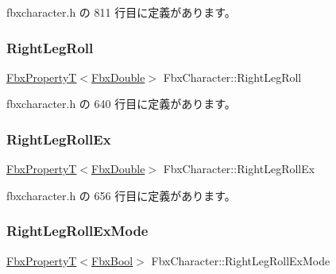  fbxcharacter.\+h の 811 行目に定義があります。

\mbox{\label{class_fbx_character_a2f5abce5bc5a72830f029b959077d7b2}} 
\subsubsection{\texorpdfstring{Right\+Leg\+Roll}{RightLegRoll}}
{\footnotesize\ttfamily \hyperlink{class_fbx_property_t}{Fbx\+PropertyT}$<$\hyperlink{fbxtypes_8h_a171e72a1c46fc15c1a6c9c31948c1c5b}{Fbx\+Double}$>$ Fbx\+Character\+::\+Right\+Leg\+Roll}



 fbxcharacter.\+h の 640 行目に定義があります。

\mbox{\label{class_fbx_character_a3db8a0efa15b90ce8afe21b454615153}} 
\subsubsection{\texorpdfstring{Right\+Leg\+Roll\+Ex}{RightLegRollEx}}
{\footnotesize\ttfamily \hyperlink{class_fbx_property_t}{Fbx\+PropertyT}$<$\hyperlink{fbxtypes_8h_a171e72a1c46fc15c1a6c9c31948c1c5b}{Fbx\+Double}$>$ Fbx\+Character\+::\+Right\+Leg\+Roll\+Ex}



 fbxcharacter.\+h の 656 行目に定義があります。

\mbox{\label{class_fbx_character_a98fcff118d93fcd5db044179fc3d9487}} 
\subsubsection{\texorpdfstring{Right\+Leg\+Roll\+Ex\+Mode}{RightLegRollExMode}}
{\footnotesize\ttfamily \hyperlink{class_fbx_property_t}{Fbx\+PropertyT}$<$\hyperlink{fbxtypes_8h_a92e0562b2fe33e76a242f498b362262e}{Fbx\+Bool}$>$ Fbx\+Character\+::\+Right\+Leg\+Roll\+Ex\+Mode}



